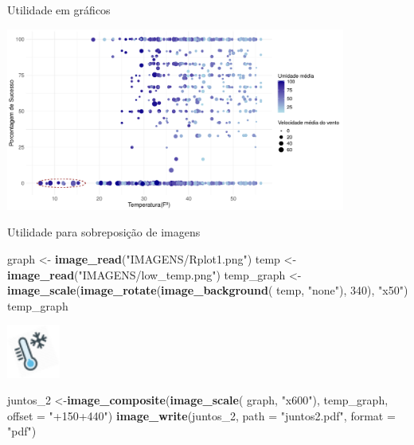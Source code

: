 \documentclass[
  ignorenonframetext,
]{beamer}
\newenvironment{Shaded}{\begin{snugshade}}{\end{snugshade}}
\newcommand{\DataTypeTok}[1]{\textcolor[rgb]{0.13,0.29,0.53}{#1}}
\newcommand{\DecValTok}[1]{\textcolor[rgb]{0.00,0.00,0.81}{#1}}
\newcommand{\KeywordTok}[1]{\textcolor[rgb]{0.13,0.29,0.53}{\textbf{#1}}}
\newcommand{\NormalTok}[1]{#1}
\newcommand{\StringTok}[1]{\textcolor[rgb]{0.31,0.60,0.02}{#1}}
\begin{document}
\begin{frame}{Utilidade em gráficos}
\protect\hypertarget{utilidade-em-gruxe1ficos}{}

\small

\includegraphics[width=4.4in]{PSxTEMP}

\begin{center}
\tiny{}
\end{center}

\end{frame}

\begin{frame}[fragile]{Utilidade para sobreposição de imagens}
\protect\hypertarget{utilidade-para-sobreposiuxe7uxe3o-de-imagens}{}

\begin{Shaded}
\begin{Highlighting}[]
\NormalTok{graph <-}\StringTok{ }\KeywordTok{image_read}\NormalTok{(}\StringTok{"IMAGENS/Rplot1.png"}\NormalTok{)}
\NormalTok{temp <-}\StringTok{ }\KeywordTok{image_read}\NormalTok{(}\StringTok{"IMAGENS/low_temp.png"}\NormalTok{)}
\NormalTok{temp_graph <-}\StringTok{ }\KeywordTok{image_scale}\NormalTok{(}\KeywordTok{image_rotate}\NormalTok{(}\KeywordTok{image_background}\NormalTok{(}
\NormalTok{  temp, }\StringTok{"none"}\NormalTok{), }\DecValTok{340}\NormalTok{), }\StringTok{"x50"}\NormalTok{)}
\NormalTok{temp_graph}
\end{Highlighting}
\end{Shaded}

\includegraphics[width=0.69in]{SLIDES_files/figure-beamer/6-1}

\begin{Shaded}
\begin{Highlighting}[]
\NormalTok{juntos_}\DecValTok{2}\NormalTok{ <-}\KeywordTok{image_composite}\NormalTok{(}\KeywordTok{image_scale}\NormalTok{(}
\NormalTok{  graph, }\StringTok{"x600"}\NormalTok{), temp_graph, }\DataTypeTok{offset =} \StringTok{"+150+440"}\NormalTok{)}
\KeywordTok{image_write}\NormalTok{(juntos_}\DecValTok{2}\NormalTok{, }\DataTypeTok{path =} \StringTok{"juntos2.pdf"}\NormalTok{,}
            \DataTypeTok{format =} \StringTok{"pdf"}\NormalTok{)}
\end{Highlighting}
\end{Shaded}

\end{frame}
\end{document}
